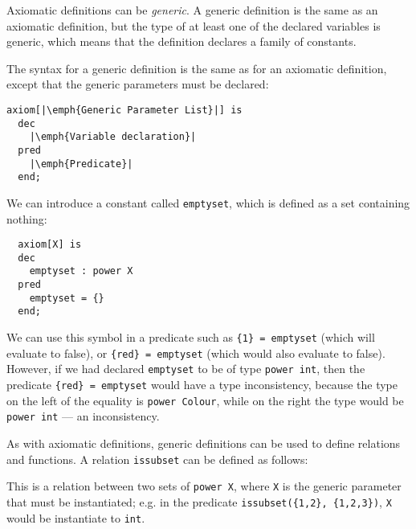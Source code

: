 Axiomatic definitions can be \emph{generic}. A generic definition is the same as an axiomatic definition, but the type of at least one of the declared variables is generic, which means that the definition declares a family of constants. 

The syntax for a generic definition is the same as for an axiomatic definition, except that the generic parameters must be declared:

\lstset{aboveskip=3mm}
\begin{lstlisting}[escapeinside={||}]
  axiom[|\emph{Generic Parameter List}|] is
  dec    
    |\emph{Variable declaration}|
  pred
    |\emph{Predicate}|
  end;
\end{lstlisting}


\begin{example}
We can introduce a constant called \texttt{emptyset}, which is defined as a set containing nothing:

\lstset{aboveskip=3mm}
\begin{lstlisting}
  axiom[X] is
  dec    
    emptyset : power X
  pred
    emptyset = {}
  end;
\end{lstlisting}

We can use this symbol in a predicate such as \texttt{\{1\} = emptyset} (which will evaluate to false), or \texttt{\{red\} = emptyset} (which would also evaluate to false). However, if we had declared \texttt{emptyset} to be of type \texttt{power int}, then the predicate \texttt{\{red\} = emptyset} would have a type inconsistency, because the type on the left of the equality is \texttt{power Colour}, while on the right the type would be \texttt{power int} --- an inconsistency.

\end{example}

\begin{example}
As with axiomatic definitions, generic definitions can be used to define relations and functions. A relation \texttt{issubset} can be defined as follows:



This is a relation between two sets of \texttt{power X}, where \texttt{X} is the generic parameter that must be instantiated; e.g. in the predicate \texttt{issubset(\{1,2\}, \{1,2,3\})}, \texttt{X} would be instantiate to \texttt{int}.

\end{example}


